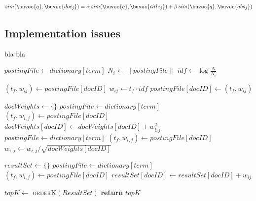 \begin{equation} \label{eq:zone_indexing_scoring}
 sim(\buvec{q},\buvec{doc_j}) = \alpha \, sim(\buvec{q}, \buvec{title_j}) + \beta \, sim(\buvec{q}, \buvec{abs_j})
\end{equation}

\subsection{Implementation issues}


bla bla

\begin{algorithm}
\caption{Global Inverse Document Frequency computation algorithm}%
\begin{algorithmic}[1]
	\State $postingFile \gets dictionary[term]$
	\State $N_i \gets \|postingFile\|$ %
	\State $idf \gets \log\frac{N}{N_i}$

		\State $(t_f, w_{ij}) \gets postingFile[docID]$
		\State $w_{ij} \gets t_f \cdot idf$
		\State $postingFile[docID] \gets (t_f, w_{ij})$
	\EndFor
\EndFor
\EndProcedure
\end{algorithmic}
\end{algorithm}

\begin{algorithm}
\caption{Document vectors normalization algorithm}%
\begin{algorithmic}[1]
\State $docWeights \gets \{\}$
	\State $postingFile \gets dictionary[term]$
		\State $(t_f, w_{i,j}) \gets postingFile[docID]$
		\State $docWeights[docID] \gets docWeights[docID] + w_{i,j}^2$
	\EndFor
\EndFor
{}
	\State $postingFile \gets dictionary[term]$
		\State $(t_f, w_{i,j}) \gets postingFile[docID]$
		\State $w_{i,j} \gets w_{i,j} / \sqrt{docWeights[docID]}$
	\EndFor
\EndFor
\EndProcedure
\end{algorithmic}
\end{algorithm}



\begin{algorithm}
\caption{Computation of the $k$ best documents}%
\begin{algorithmic}[1]
\State $resultSet \gets \{\}$
		\State $postingFile \gets dictionary[term]$
			\State $(t_f, w_{i,j}) \gets postingFile[docID]$
			\State $resultSet[docID] \gets resultSet[docID] + w_{ij}$
		\EndFor

	\EndIf
\EndFor
\State $topK \gets$ \textsc{orderK}$(ResultSet)$
\State \textbf{return} $topK$
\EndFunction
\end{algorithmic}
\end{algorithm}


